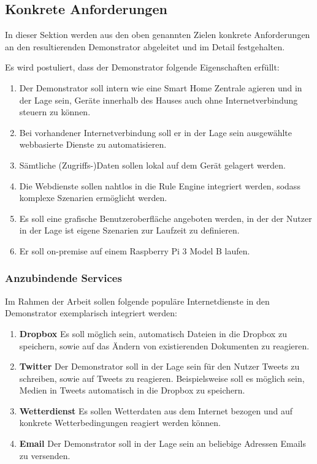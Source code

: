 \subsection{Konkrete Anforderungen}
\label{sec:anforderungen}
In dieser Sektion werden aus den oben genannten Zielen konkrete Anforderungen an den resultierenden Demonstrator abgeleitet und im Detail festgehalten.

Es wird postuliert, dass der Demonstrator folgende Eigenschaften erfüllt:
\begin{enumerate}

\item Der Demonstrator soll intern wie eine Smart Home Zentrale agieren und in der Lage sein, Geräte innerhalb des Hauses auch ohne Internetverbindung steuern zu können.
\item Bei vorhandener Internetverbindung soll er in der Lage sein ausgewählte  webbasierte Dienste zu automatisieren.
\item Sämtliche (Zugriffs-)Daten sollen lokal auf dem Gerät gelagert werden. 
\item Die Webdienste sollen nahtlos in die Rule Engine integriert werden, sodass komplexe Szenarien ermöglicht werden.
\item Es soll eine grafische Benutzeroberfläche angeboten werden, in der der Nutzer in der Lage ist eigene Szenarien zur Laufzeit zu definieren.
\item Er soll on-premise auf einem Raspberry Pi 3 Model B laufen.

\end{enumerate}

\subsubsection{Anzubindende Services}
\label{subsec:anzubindende_services}
Im Rahmen der Arbeit sollen folgende populäre Internetdienste in den Demonstrator exemplarisch integriert werden:
\begin{enumerate}
\item \textbf{Dropbox}\cite{dropbox} Es soll möglich sein, automatisch Dateien in die Dropbox zu speichern, sowie auf das Ändern von existierenden Dokumenten zu reagieren.
\item \textbf{Twitter}\cite{twitter} Der Demonstrator soll in der Lage sein für den Nutzer Tweets zu schreiben, sowie auf Tweets zu reagieren. Beispielsweise soll es möglich sein, Medien in Tweets automatisch in die Dropbox zu speichern.
\item \textbf{Wetterdienst}\cite{wetterapi} Es sollen Wetterdaten aus dem Internet bezogen und auf konkrete Wetterbedingungen reagiert werden können.
\item \textbf{Email} Der Demonstrator soll in der Lage sein an beliebige Adressen Emails zu versenden.
\end{enumerate}




